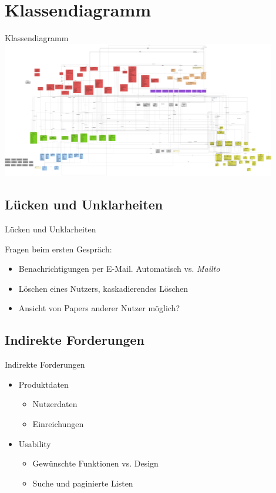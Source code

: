 \documentclass{beamer}
\begin{document}
    \section{Klassendiagramm}
    \begin{frame}{Klassendiagramm}
        \centering
        \includegraphics[width=0.9\textwidth]{../../docs/Entwurf/graphics/klassendiagramm_png.png}
    \end{frame}


    \subsection{Lücken und Unklarheiten}
    \begin{frame}{Lücken und Unklarheiten}

        Fragen beim ersten Gespräch:
        \pause

        \begin{itemize}
            \item Benachrichtigungen per E-Mail. Automatisch vs. \emph{Mailto}
            \pause
            \item Löschen eines Nutzers, kaskadierendes Löschen
            \pause
            \item Ansicht von Papers anderer Nutzer möglich?
        \end{itemize}

    \end{frame}

    \subsection{Indirekte Forderungen}
    \begin{frame}{Indirekte Forderungen}
        \begin{itemize}
            \item Produktdaten
            \begin{itemize}
                \item Nutzerdaten
                \item Einreichungen
            \end{itemize}
            \pause
            \item Usability
            \begin{itemize}
                \item Gewünschte Funktionen vs. Design
                \item Suche und paginierte Listen
            \end{itemize}
        \end{itemize}
    \end{frame}
\end{document}
